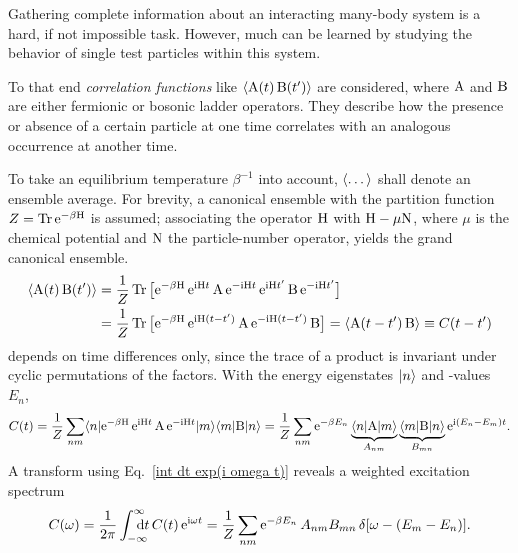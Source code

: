 Gathering complete information about an interacting many-body system is a hard,
if not impossible task. However, much can be learned by studying the behavior of
single test particles within this system.

To that end \emph{correlation functions} like $\langle\mathrm A(t) \, \mathrm B(t')\rangle$ are
considered, where $\mathrm A$ and $\mathrm B$ are either fermionic or bosonic ladder
operators. They describe how the presence or absence of a certain particle at
one time correlates with an analogous occurrence at another time.

To take an equilibrium temperature $\beta^{-1}$ into account, $\langle\dots\rangle$ shall
denote an ensemble average. For brevity, a canonical ensemble with the partition
function $Z = \operatorname{Tr} \mathrm e^{-\beta \mathrm H}$ is assumed; associating the 
operator $\mathrm H$ with $\mathrm H - \mu \mathrm N$, where $\mu$ is the chemical potential
and $\mathrm N$ the particle-number operator, yields the grand canonical ensemble.
%
\begin{equation} \label{C(t)}
    \begin{split}
        \langle\mathrm A(t) \, \mathrm B(t')\rangle &= \frac 1 Z \operatorname{Tr}
        \big[
            \mathrm e^{-\beta \mathrm H} \,
            \mathrm e^{\mathrm i \mathrm H t} \, \mathrm A \, \mathrm e^{-\mathrm i \mathrm H t} \,
            \mathrm e^{\mathrm i \mathrm H t'} \, \mathrm B \, \mathrm e^{-\mathrm i \mathrm H t'}
        \big]
        \\
        &= \frac 1 Z \operatorname{Tr}
        \big[
            \mathrm e^{-\beta \mathrm H} \,
            \mathrm e^{\mathrm i \mathrm H (t - t')} \, \mathrm A \, \mathrm e^{-\mathrm i \mathrm H (t - t')} \, \mathrm B
        \big]
        = \langle\mathrm A(t - t') \, \mathrm B\rangle \equiv C(t - t')
    \end{split}
\end{equation}
%
depends on time differences only, since the trace of a product is invariant
under cyclic permutations of the factors. With the energy eigenstates $|n\rangle$
and -values $E_n$,
%
\begin{equation} \label{C(t) in energy basis}
    C(t) = \frac 1 Z \sum_{n m} \langle n|
    \mathrm e^{-\beta \mathrm H} \, \mathrm e^{\mathrm i \mathrm H t} \, \mathrm A \, \mathrm e^{-\mathrm i \mathrm H t}
    |m\rangle \langle m| \mathrm B |n\rangle =
    \frac 1 Z \sum_{n m} \mathrm e^{-\beta E_n}
    \underbrace{\langle n| \mathrm A |m\rangle}_{A_{n m}}
    \underbrace{\langle m| \mathrm B |n\rangle}_{B_{m n}}
    \mathrm e^{\mathrm i (E_n - E_m) t}.
\end{equation}
%
A  transform using Eq.~\ref{int dt exp(i omega t)} reveals a
weighted excitation spectrum
%
\begin{equation} \label{C(omega)}
    C(\omega) = \frac 1 {2 \pi} \int \from{-\infty} \till \infty \D t \,
    C(t) \, \E^{\I \omega t} =
    \frac 1 Z \sum_{n m} \E^{-\beta E_n} \, A_{n m} B_{m n} \,
    \delta[\omega - (E_m - E_n)].
\end{equation}

